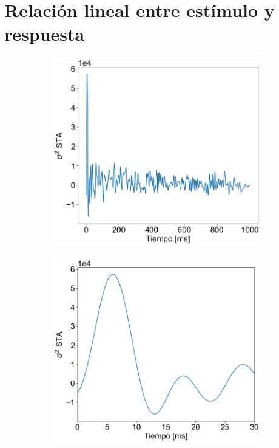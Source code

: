\documentclass[aps,prb,twocolumn,superscriptaddress,floatfix,longbibliography]{revtex4-2}
\begin{document}
\section{Relación lineal entre estímulo y respuesta}


\begin{figure}[h]
  \centering
  \begin{subfigure}[b]{0.3\textwidth}
      \centering
      \includegraphics[width=\textwidth]{STA_total.png}
      \caption{\label{fig:STA_total}}
      \end{subfigure}
  \hfill
  \begin{subfigure}[b]{0.3\textwidth}
      \centering
      \includegraphics[width=\textwidth]{STA_parcial.png}

\end{subfigure}
\end{figure}
\end{document}
